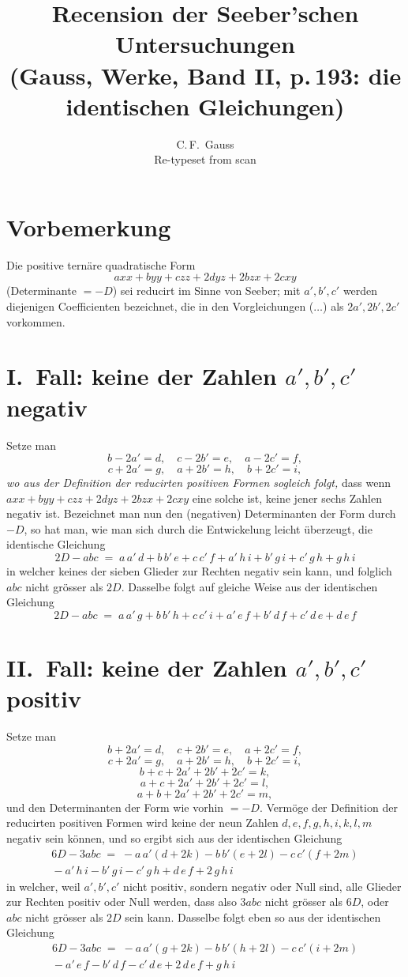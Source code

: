 \documentclass[11pt]{article}
\title{Recension der Seeber'schen Untersuchungen\\[2pt]
\large (Gauss, Werke, Band II, p.\,193: die identischen Gleichungen)}
\author{C.\,F.\ Gauss\\[2pt]\normalsize Re-typeset from scan}
\date{}
\begin{document}
\maketitle

\section*{Vorbemerkung}

Die positive ternäre quadratische Form
\[
  axx+byy+czz+2dyz+2bzx+2cxy
\]
(Determinante $=-D$) sei reducirt im Sinne von Seeber; mit $a',b',c'$ werden
diejenigen Coefficienten bezeichnet, die in den Vorgleichungen ($\dots$) als
$2a', 2b', 2c'$ vorkommen.

\section*{I.\ Fall: keine der Zahlen $a',b',c'$ negativ}

Setze man
\[
  b-2a'=d,\quad c-2b'=e,\quad a-2c'=f,
\]
\[
  c+2a'=g,\quad a+2b'=h,\quad b+2c'=i,
\]
\emph{wo aus der Definition der reducirten positiven Formen sogleich folgt,}
dass wenn $axx+byy+czz+2dyz+2bzx+2cxy$ eine solche ist, keine jener sechs
Zahlen negativ ist. Bezeichnet man nun den (negativen) Determinanten der Form
durch $-D$, so hat man, wie man sich durch die Entwickelung leicht überzeugt,
die identische Gleichung
\[
\boxed{\;2D-abc \;=\; a\,a'\,d+b\,b'\,e+c\,c'\,f+a'\,h\,i+b'\,g\,i+c'\,g\,h+g\,h\,i\;}
\]
in welcher keines der sieben Glieder zur Rechten negativ sein kann, und folglich
$abc$ nicht grösser als $2D$. Dasselbe folgt auf gleiche Weise aus der
identischen Gleichung
\[
\boxed{\;2D-abc \;=\; a\,a'\,g+b\,b'\,h+c\,c'\,i+a'\,e\,f+b'\,d\,f+c'\,d\,e+d\,e\,f\;}
\]

\section*{II.\ Fall: keine der Zahlen $a',b',c'$ positiv}

Setze man
\[
  b+2a'=d,\quad c+2b'=e,\quad a+2c'=f,
\]
\[
  c+2a'=g,\quad a+2b'=h,\quad b+2c'=i,
\]
\[
  b+c+2a'+2b'+2c'=k,
\]
\[
  a+c+2a'+2b'+2c'=l,
\]
\[
  a+b+2a'+2b'+2c'=m,
\]
und den Determinanten der Form wie vorhin $=-D$. Vermöge der Definition der
reducirten positiven Formen wird keine der neun Zahlen $d,e,f,g,h,i,k,l,m$
negativ sein können, und so ergibt sich aus der identischen Gleichung
\begin{multline*}
6D-3abc \;=\; -a\,a'(d+2k)-b\,b'(e+2l)-c\,c'(f+2m)\\
{}-a'\,h\,i-b'\,g\,i-c'\,g\,h+d\,e\,f+2\,g\,h\,i
\end{multline*}
in welcher, weil $a',b',c'$ nicht positiv, sondern negativ oder Null sind, alle
Glieder zur Rechten positiv oder Null werden, dass also $3abc$ nicht grösser als
$6D$, oder $abc$ nicht grösser als $2D$ sein kann. Dasselbe folgt eben so aus
der identischen Gleichung
\begin{multline*}
6D-3abc \;=\; -a\,a'(g+2k)-b\,b'(h+2l)-c\,c'(i+2m)\\
{}-a'\,e\,f-b'\,d\,f-c'\,d\,e+2\,d\,e\,f+g\,h\,i
\end{multline*}
\end{document}
